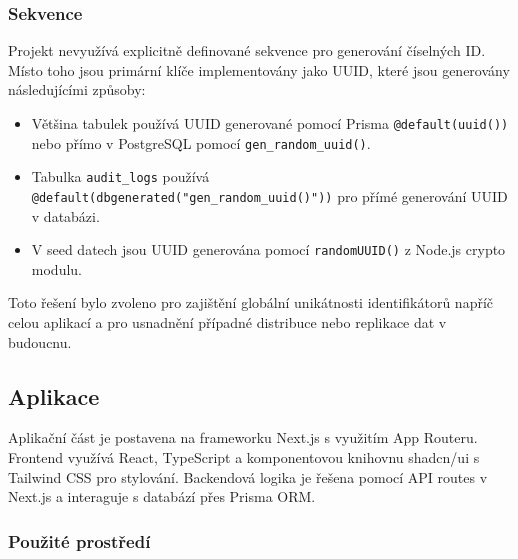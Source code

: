 \documentclass[12pt, a4paper]{article}
\begin{document}
\subsubsection{Sekvence}
\label{subsubsec:sekvence}

Projekt nevyužívá explicitně definované sekvence pro generování číselných ID. Místo toho jsou primární klíče implementovány jako UUID, které jsou generovány následujícími způsoby:

\begin{itemize}
    \item Většina tabulek používá UUID generované pomocí Prisma \texttt{@default(uuid())} nebo přímo v PostgreSQL pomocí \texttt{gen\_random\_uuid()}.
    \item Tabulka \texttt{audit\_logs} používá \texttt{@default(dbgenerated("gen\_random\_uuid()"))} pro přímé generování UUID v databázi.
    \item V seed datech jsou UUID generována pomocí \texttt{randomUUID()} z Node.js crypto modulu.
\end{itemize}

Toto řešení bylo zvoleno pro zajištění globální unikátnosti identifikátorů napříč celou aplikací a pro usnadnění případné distribuce nebo replikace dat v budoucnu.

\subsection{Aplikace}
\label{subsec:aplikace}

Aplikační část je postavena na frameworku Next.js s využitím App Routeru. Frontend využívá React, TypeScript a komponentovou knihovnu shadcn/ui s Tailwind CSS pro stylování. Backendová logika je řešena pomocí API routes v Next.js a interaguje s databází přes Prisma ORM.

\subsubsection{Použité prostředí}
\label{subsubsec:pouzite_prostredi}
\end{document}
